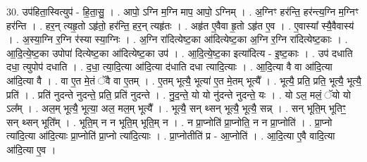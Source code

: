\documentclass[17pt]{extarticle}
\begin{document}
30. उप॑हिता॒स्वित्युप॑ - हि॒ता॒सु॒ । . आपो॒ ऽग्नि म॒ग्नि माप॒ आपो॒ ऽग्निम् । . अ॒ग्निꣳ हर॑न्ति॒ हर॑न्त्य॒ग्नि म॒ग्निꣳ हर॑न्ति । . हर॒न् त्यहृ॒तो ऽहृ॑तो॒ हर॑न्ति॒ हर॒न् त्यहृ॑तः । . अहृ॑त ए॒वैवा हृ॒तो ऽहृ॑त ए॒व । . ए॒वास्या᳚ स्यै॒वैवास्य॑ । . अ॒स्या॒ग्नि र॒ग्नि र॑स्या स्या॒ग्निः । . अ॒ग्नि रा॑दित्येष्ट॒का आ॑दित्येष्ट॒का अ॒ग्नि र॒ग्नि रा॑दित्येष्ट॒काः । . आ॒दि॒त्ये॒ष्ट॒का उपोपा॑ दित्येष्ट॒का आ॑दित्येष्ट॒का उप॑ । . आ॒दि॒त्ये॒ष्ट॒का इत्या॑दित्य - इ॒ष्ट॒काः । . उप॑ दधाति दधा॒ त्युपोप॑ दधाति । . द॒धा॒ त्या॒दि॒त्या आ॑दि॒त्या द॑धाति दधा त्यादि॒त्याः । . आ॒दि॒त्या वै वा आ॑दि॒त्या आ॑दि॒त्या वै । . वा ए॒त मे॒तं ॅवै वा ए॒तम् । . ए॒तम् भूत्यै॒ भूत्या॑ ए॒त मे॒तम् भूत्यै᳚ । . भूत्यै॒ प्रति॒ प्रति॒ भूत्यै॒ भूत्यै॒ प्रति॑ । . प्रति॑ नुदन्ते नुदन्ते॒ प्रति॒ प्रति॑ नुदन्ते । . नु॒द॒न्ते॒ यो यो नु॑दन्ते नुदन्ते॒ यः । . यो ऽल॒ मलं॒ ॅयो यो ऽल᳚म् । . अल॒म् भूत्यै॒ भूत्या॒ अल॒ मल॒म् भूत्यै᳚ । . भूत्यै॒ सन् थ्सन् भूत्यै॒ भूत्यै॒ सन्न् । . सन् भूति॒म् भूतिꣳ॒॒ सन् थ्सन् भूति᳚म् । . भूति॒म् न न भूति॒म् भूति॒म् न । . न प्रा॒प्नोति॑ प्रा॒प्नोति॒ न न प्रा॒प्नोति॑ । . प्रा॒प्नो त्या॑दि॒त्या आ॑दि॒त्याः प्रा॒प्नोति॑ प्रा॒प्नो त्या॑दि॒त्याः । . प्रा॒प्नोतीति॑ प्र - आ॒प्नोति॑ । . आ॒दि॒त्या ए॒वै वादि॒त्या आ॑दि॒त्या ए॒व । \newline
\end{document}
